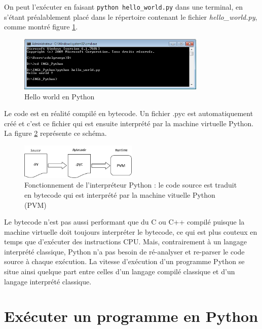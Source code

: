\documentclass[12pt, a4paper]{article}
\begin{document}
On peut l'exécuter en faisant \lstinline{python hello_world.py} dans une terminal, en s'étant préalablement placé dans le répertoire contenant le fichier \textit{hello\_world.py}, comme montré figure \ref{fig:hello_world}.

\begin{figure}[H]
	\center \includegraphics[width=0.8\textwidth]{img/hello_world.png}
	\caption{Hello world en Python}
	\label{fig:hello_world}
\end{figure}

Le code est en réalité compilé en bytecode. Un fichier .pyc est automatiquement créé et c'est ce fichier qui est ensuite interprété par la machine virtuelle Python. La figure \ref{fig:bytecode_execution} représente ce schéma. 

\begin{figure}[H]
	\center \includegraphics[width=0.5\textwidth]{img/bytecode_execution.png}
	\caption{Fonctionnement de l'interpréteur Python : le code source est traduit en bytecode qui est interprété par la machine vituelle Python (PVM)}
	\label{fig:bytecode_execution}
\end{figure}

Le bytecode n'est pas aussi performant que du C ou C++ compilé puisque la machine virtuelle doit toujours interpréter le bytecode, ce qui est plus couteux en temps que d'exécuter des instructions CPU. Mais, contrairement à un langage interprété classique, Python n'a pas besoin de ré-analyser et re-parser le code source à chaque exécution. La vitesse d'exécution d'un programme Python se situe ainsi quelque part entre celles d'un langage compilé classique et d'un langage interprété classique.



\section{Exécuter un programme en Python}
\end{document}
